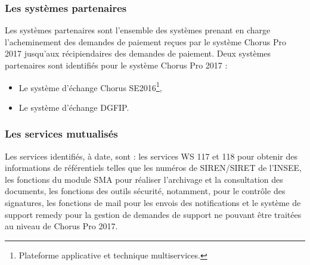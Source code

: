 \documentclass[12pt,a4paper]{article}
\begin{document}
\subsubsection{Les systèmes partenaires}
Les systèmes partenaires sont l’ensemble des systèmes prenant en charge l’acheminement des demandes de paiement reçues par le système Chorus Pro 2017 jusqu’aux récipiendaires des demandes de paiement. Deux systèmes partenaires sont identifiés pour le système Chorus Pro 2017 :
\smallbreak
\begin{itemize}
\item	Le système d’échange Chorus SE2016\footnote{Plateforme applicative et technique multiservices.},
\item	Le système d’échange DGFIP.
\end{itemize}
\medbreak
\subsubsection{Les services mutualisés}
Les services identifiés, à date, sont : les services WS 117 et 118 pour obtenir des informations de référentiels telles que les numéros de SIREN/SIRET de l’INSEE, les fonctions du module SMA pour réaliser l’archivage et la consultation des documents, les fonctions des outils sécurité, notamment, pour le contrôle des signatures, les fonctions de mail pour les envois des notifications et le système de support remedy pour la gestion de demandes de support ne pouvant être traitées au niveau de Chorus Pro 2017. 
\end{document}
